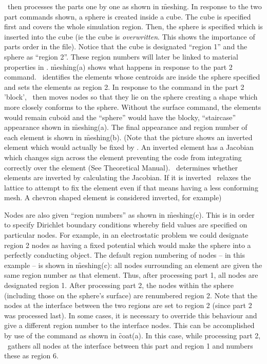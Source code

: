 \documentclass[a4paper,twoside,11pt]{book}
\begin{document}
\zmesh\ then processes the parts one by one as shown in \f{meshing}. In
response to the two part commands shown, a sphere is created inside a
cube. The cube is specified first and covers the whole simulation
region. Then, the sphere is specified which is inserted into the cube
(ie the cube is \emph{overwritten}. This shows the importance of parts order in
the file). Notice that the cube is designated ``region 1'' and the
sphere as ``region 2''. These region numbers will later be linked to
material properties in . \f{meshing}(a) shows what
happens in response to the part 2 command. \zmesh\ identifies the
elements whose centroids are inside the sphere specified and sets the
elements as region 2. In response to the  command in the
part 2 'block', \zmesh\ then moves nodes so that they lie on the sphere
creating a shape which more closely conforms to the sphere. Without
the surface command, the elements would remain cuboid and the
``sphere'' would have the blocky, ``staircase'' appearance shown in
\f{meshing}(a). The final appearance and region number of each element
is shown in \f{meshing}(b). (Note that the picture shows an inverted
element which would actually be fixed by \zmesh. An inverted element
has a Jacobian which changes sign across the element preventing the
code from integrating correctly over the element (See Theoretical
Manual). \zmesh\ determines whether elements are inverted by calculating
the Jacobian. If it is inverted \zmesh\ relaxes the lattice to attempt
to fix the element even if that means having a less conforming mesh. A
chevron shaped element is considered inverted, for example)

Nodes are also given ``region numbers'' as shown in
\f{meshing}(c). This is in order to specify Dirichlet boundary
conditions  whereby field values are specified on
particular nodes. For example, in an electrostatic problem we could
designate region 2 nodes as having a fixed potential which would make
the sphere into a perfectly conducting object. The default region
numbering of nodes -- in this example -- is shown in \f{meshing}(c):
all nodes surrounding an element are given the same region number as
that element. Thus, after processing part 1, all nodes are designated
region 1. After processing part 2, the nodes within the sphere
(including those on the sphere's surface) are renumbered region
2. Note that the nodes at the interface between the two regions are
set to region 2 (since part 2 was processed last). In some cases, it
is necessary to override this behaviour and give a different region
number to the interface nodes. This can be accomplished by use of the
 command as shown in \f{coat}(a). In this case, while
processing part 2, \zmesh\ gathers all nodes at the interface between
this part and region 1 and numbers these as region 6.
\end{document}
